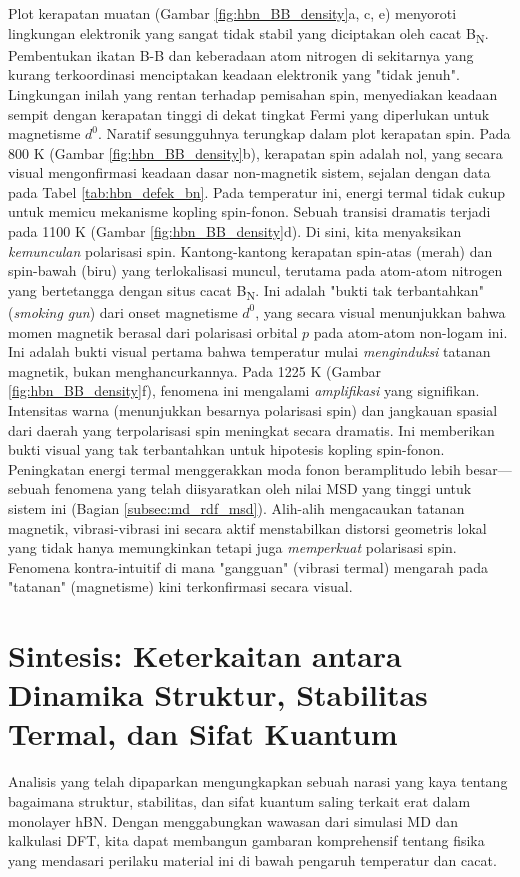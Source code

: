 Plot kerapatan muatan (Gambar \ref{fig:hbn_BB_density}a, c, e) menyoroti lingkungan elektronik yang sangat tidak stabil yang diciptakan oleh cacat B\textsubscript{N}.
Pembentukan ikatan B-B dan keberadaan atom nitrogen di sekitarnya yang kurang terkoordinasi menciptakan keadaan elektronik yang "tidak jenuh".
Lingkungan inilah yang rentan terhadap pemisahan spin, menyediakan keadaan sempit dengan kerapatan tinggi di dekat tingkat Fermi yang diperlukan untuk magnetisme $d^0$.
Naratif sesungguhnya terungkap dalam plot kerapatan spin. Pada 800 K (Gambar \ref{fig:hbn_BB_density}b), kerapatan spin adalah nol, yang secara visual mengonfirmasi keadaan dasar non-magnetik sistem, sejalan dengan data pada Tabel \ref{tab:hbn_defek_bn}.
Pada temperatur ini, energi termal tidak cukup untuk memicu mekanisme kopling spin-fonon.
Sebuah transisi dramatis terjadi pada 1100 K (Gambar \ref{fig:hbn_BB_density}d). Di sini, kita menyaksikan \emph{kemunculan} polarisasi spin.
Kantong-kantong kerapatan spin-atas (merah) dan spin-bawah (biru) yang terlokalisasi muncul, terutama pada atom-atom nitrogen yang bertetangga dengan situs cacat B\textsubscript{N}.
Ini adalah "bukti tak terbantahkan" (\emph{smoking gun}) dari onset magnetisme $d^0$, yang secara visual menunjukkan bahwa momen magnetik berasal dari polarisasi orbital $p$ pada atom-atom non-logam ini.
Ini adalah bukti visual pertama bahwa temperatur mulai \emph{menginduksi} tatanan magnetik, bukan menghancurkannya.
Pada 1225 K (Gambar \ref{fig:hbn_BB_density}f), fenomena ini mengalami \emph{amplifikasi} yang signifikan.
Intensitas warna (menunjukkan besarnya polarisasi spin) dan jangkauan spasial dari daerah yang terpolarisasi spin meningkat secara dramatis.
Ini memberikan bukti visual yang tak terbantahkan untuk hipotesis kopling spin-fonon.
Peningkatan energi termal menggerakkan moda fonon beramplitudo lebih besar—sebuah fenomena yang telah diisyaratkan oleh nilai MSD yang tinggi untuk sistem ini (Bagian \ref{subsec:md_rdf_msd}).
Alih-alih mengacaukan tatanan magnetik, vibrasi-vibrasi ini secara aktif menstabilkan distorsi geometris lokal yang tidak hanya memungkinkan tetapi juga \emph{memperkuat} polarisasi spin.
Fenomena kontra-intuitif di mana "gangguan" (vibrasi termal) mengarah pada "tatanan" (magnetisme) kini terkonfirmasi secara visual.

\section{Sintesis: Keterkaitan antara Dinamika Struktur, Stabilitas Termal, dan Sifat Kuantum}
\label{sec:diskusi_komprehensif}
Analisis yang telah dipaparkan mengungkapkan sebuah narasi yang kaya tentang bagaimana struktur, stabilitas, dan sifat kuantum saling terkait erat dalam monolayer hBN.
Dengan menggabungkan wawasan dari simulasi MD dan kalkulasi DFT, kita dapat membangun gambaran komprehensif tentang fisika yang mendasari perilaku material ini di bawah pengaruh temperatur dan cacat.
